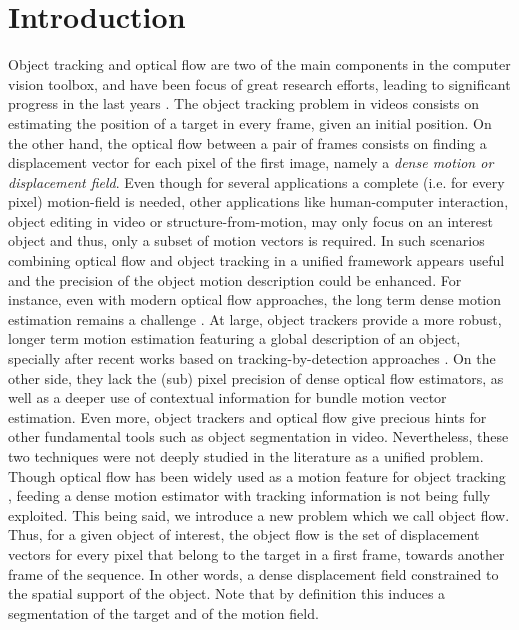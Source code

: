 
\chapter{Introduction} \label{chap:intro}

Object tracking and optical flow are two of the main components in the
computer vision toolbox, and have been focus of great research efforts, 
leading to significant progress in the last years \cite{c16}\cite{c17}. 
The object tracking problem in videos consists on estimating the 
position of a target in every frame, given an initial position. On the
other hand, the optical flow between a pair of frames consists on finding a displacement vector 
for each pixel of the first image, namely a {\it dense motion  or displacement field}. Even though for several
applications a complete (i.e. for every pixel) motion-field is needed, other applications like
human-computer interaction, object editing in video or structure-from-motion,
may only focus on an interest object and thus, only a subset of motion vectors is required. 
In such scenarios combining optical flow and object tracking in a unified 
framework appears useful and the precision of the object motion description 
could be enhanced. For instance, even with modern optical flow approaches, 
the long term dense motion estimation remains a challenge \cite{c20}\cite{c22}.  At large, object trackers provide a more robust, 
longer term motion estimation featuring a global description of an object, specially after recent works based on tracking-by-detection approaches \cite{c16}\cite{c23}\cite{c24}. 
On the other side, they lack the (sub) pixel precision of dense optical flow estimators, as well as a deeper use of contextual information for bundle motion 
vector estimation. 
Even more,  object trackers and optical flow give precious hints for other fundamental tools such as 
object segmentation in video. Nevertheless,
these two techniques were not deeply studied in the literature as a unified problem. Though optical flow has been widely used as a motion 
feature for object tracking \cite{c25}, feeding a dense motion estimator with tracking information is not being fully exploited.
This being said, we introduce  a new problem which we call object flow. Thus, for a given object of interest, 
the object flow is the set of displacement vectors for every pixel that belong to the target in a first frame, 
towards another frame of the sequence. In other words, a dense displacement  field constrained to the spatial support of the object. 
Note that by definition this induces a segmentation of the target and of the motion field.


